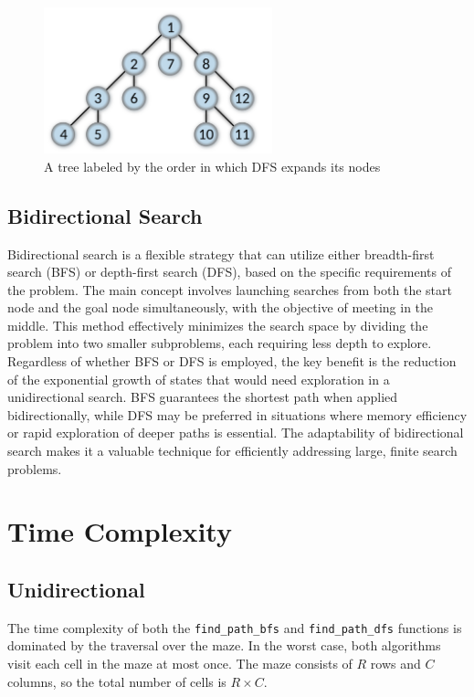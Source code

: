 \documentclass[final, journal, 11pt]{report}
\begin{document}
	\begin{figure}[!htbp]
		\centering
		\includegraphics[width=2.6in]{assets/DFS.png}
		\caption{A tree labeled by the order in which DFS expands its nodes}
		\label{fig:DFS}
	\end{figure} 
	
	\subsection*{Bidirectional Search}
	Bidirectional search is a flexible strategy that can utilize either breadth-first search (BFS) or depth-first search (DFS), based on the specific requirements of the problem. The main concept involves launching searches from both the start node and the goal node simultaneously, with the objective of meeting in the middle. This method effectively minimizes the search space by dividing the problem into two smaller subproblems, each requiring less depth to explore. Regardless of whether BFS or DFS is employed, the key benefit is the reduction of the exponential growth of states that would need exploration in a unidirectional search. BFS guarantees the shortest path when applied bidirectionally, while DFS may be preferred in situations where memory efficiency or rapid exploration of deeper paths is essential. The adaptability of bidirectional search makes it a valuable technique for efficiently addressing large, finite search problems.
	
	\section*{Time Complexity}
	
	\subsection*{Unidirectional}
	The time complexity of both the \texttt{find\_path\_bfs} and \texttt{find\_path\_dfs} functions is dominated by the traversal over the maze. In the worst case, both algorithms visit each cell in the maze at most once. The maze consists of \( R \) rows and \( C \) columns, so the total number of cells is \( R \times C \).
	
\end{document}

